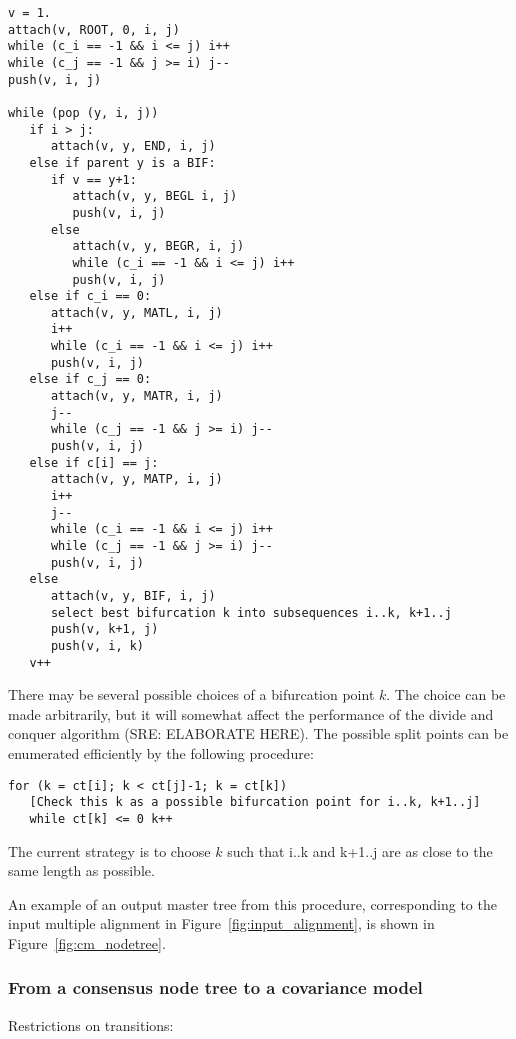 \documentclass[11pt]{article}
\begin{document}
\begin{verbatim}
v = 1.
attach(v, ROOT, 0, i, j)
while (c_i == -1 && i <= j) i++
while (c_j == -1 && j >= i) j-- 	
push(v, i, j)

while (pop (y, i, j))
   if i > j: 
      attach(v, y, END, i, j)
   else if parent y is a BIF:
      if v == y+1:
         attach(v, y, BEGL i, j)
         push(v, i, j)
      else
         attach(v, y, BEGR, i, j)
         while (c_i == -1 && i <= j) i++
         push(v, i, j)
   else if c_i == 0:
      attach(v, y, MATL, i, j)
      i++
      while (c_i == -1 && i <= j) i++
      push(v, i, j)
   else if c_j == 0:
      attach(v, y, MATR, i, j)
      j--
      while (c_j == -1 && j >= i) j-- 	
      push(v, i, j)
   else if c[i] == j:
      attach(v, y, MATP, i, j)
      i++
      j--
      while (c_i == -1 && i <= j) i++
      while (c_j == -1 && j >= i) j-- 	
      push(v, i, j)
   else 
      attach(v, y, BIF, i, j)
      select best bifurcation k into subsequences i..k, k+1..j
      push(v, k+1, j)
      push(v, i, k)
   v++
\end{verbatim}

There may be several possible choices of a bifurcation point $k$.  The
choice can be made arbitrarily, but it will somewhat affect the
performance of the divide and conquer algorithm (SRE: ELABORATE
HERE). The possible split points can be enumerated efficiently by the
following procedure:

\begin{verbatim}
for (k = ct[i]; k < ct[j]-1; k = ct[k])
   [Check this k as a possible bifurcation point for i..k, k+1..j]
   while ct[k] <= 0 k++
\end{verbatim}

The current strategy is to choose $k$ such that i..k and k+1..j are as
close to the same length as possible.

An example of an output master tree from this procedure, corresponding
to the input multiple alignment in Figure~\ref{fig:input_alignment},
is shown in Figure~\ref{fig:cm_nodetree}.

\subsubsection{From a consensus node tree to a covariance model}







Restrictions on transitions:
\end{document}
